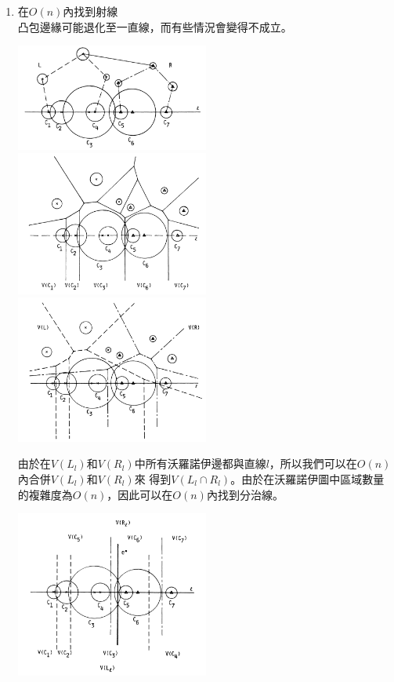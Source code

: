 \documentclass[15pt]{extarticle}
\begin{document}
\begin{enumerate}
    \item 在$O(n)$內找到射線 \\
    凸包邊緣可能退化至一直線，而有些情況會變得不成立。
    \begin{center}
        \includegraphics[width=0.5\textwidth]{fig5.png}
        \includegraphics[width=0.5\textwidth]{fig6.png}
        \includegraphics[width=0.5\textwidth]{fig7.png}
    \end{center}
    由於在$V(L_l)$和$V(R_l)$中所有沃羅諾伊邊都與直線$l$，所以我們可以在$O(n)$內合併$V(L_l)$和$V(R_l)$來
    得到$V(L_l\cap R_l)$。由於在沃羅諾伊圖中區域數量的複雜度為$O(n)$，因此可以在$O(n)$內找到分治線。
    \begin{center}
        \includegraphics[width=0.5\textwidth]{fig8.png}
    \end{center}
\end{enumerate}
\end{document}
